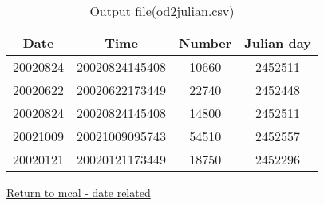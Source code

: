 \begin{table}[hbt]
\begin{center}
 \caption{Output file(od2julian.csv)}
  \begin{tabular}{|c|c|c|c|} \hline
Date&Time&Number&Julian day\\ \hline\hline
20020824&20020824145408&10660&2452511\\ \hline
20020622&20020622173449&22740&2452448\\ \hline
20020824&20020824145408&14800&2452511\\ \hline
20021009&20021009095743&54510&2452557\\ \hline
20020121&20020121173449&18750&2452296\\ \hline
  \end{tabular}
  \end{center}
\end{table}

\href{run:hizuke.pdf}{Return to mcal - date related}\\
%


